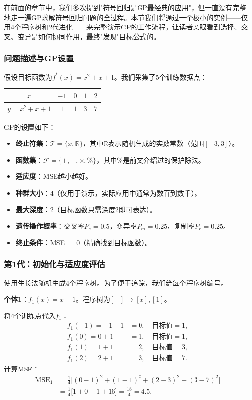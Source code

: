\documentclass[lang=cn,zihao=-4,a4paper,fontset=windows]{beautybook}
\begin{document}
在前面的章节中，我们多次提到"符号回归是GP最经典的应用"，但一直没有完整地走一遍GP求解符号回归问题的全过程。本节我们将通过一个极小的实例——仅用4个程序树和2代进化——来完整演示GP的工作流程，让读者亲眼看到选择、交叉、变异是如何协同作用，最终"发现"目标公式的。

\subsubsection{问题描述与GP设置}

假设目标函数为$f^*(x) = x^2 + x + 1$。我们采集了5个训练数据点：

\begin{center}
\begin{tabular}{ccccc}
\toprule
$x$ & $-1$ & $0$ & $1$ & $2$ \\
\midrule
$y = x^2 + x + 1$ & $1$ & $1$ & $3$ & $7$ \\
\bottomrule
\end{tabular}
\end{center}

GP的设置如下：
\begin{itemize}
    \item \textbf{终止符集}：$\mathcal{T} = \{x, \mathbb{R}\}$，其中$\mathbb{R}$表示随机生成的实数常数（范围$[-3, 3]$）。
    \item \textbf{函数集}：$\mathcal{F} = \{+, -, \times, \%\}$，其中$\%$是前文介绍过的保护除法。
    \item \textbf{适应度}：MSE越小越好。
    \item \textbf{种群大小}：4（仅用于演示，实际应用中通常为数百到数千）。
    \item \textbf{最大深度}：2（目标函数只需深度2即可表达）。
    \item \textbf{遗传操作概率}：交叉率$P_c = 0.5$，变异率$P_m = 0.25$，复制率$P_r = 0.25$。
    \item \textbf{终止条件}：MSE $= 0$（精确找到目标函数）。
\end{itemize}

\subsubsection{第1代：初始化与适应度评估}

使用生长法随机生成4个程序树。为了便于追踪，我们给每个程序树编号。

\textbf{个体1}：$f_1(x) = x + 1$。程序树为$[+] \to [x], [1]$。

将4个训练点代入$f_1$：
\begin{align*}
f_1(-1) = -1 + 1 &= 0, \quad \text{目标值} = 1, \\
f_1(0) = 0 + 1 &= 1, \quad \text{目标值} = 1, \\
f_1(1) = 1 + 1 &= 2, \quad \text{目标值} = 3, \\
f_1(2) = 2 + 1 &= 3, \quad \text{目标值} = 7.
\end{align*}
计算MSE：
\begin{align*}
\text{MSE}_1 &= \frac{1}{4}\big[(0-1)^2 + (1-1)^2 + (2-3)^2 + (3-7)^2\big] \\
&= \frac{1}{4}\big[1 + 0 + 1 + 16\big] = \frac{18}{4} = 4.5.
\end{align*}
\end{document}
